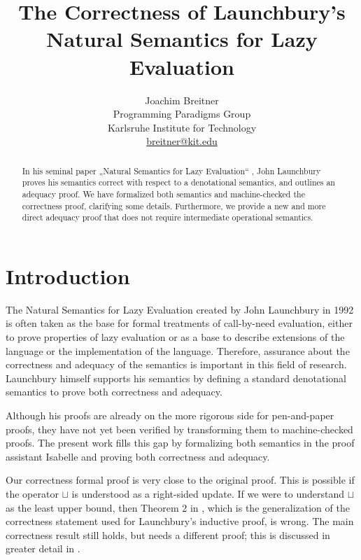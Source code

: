 \documentclass[11pt,a4paper,parskip=half]{scrartcl}
\begin{document}
\title{The Correctness of Launchbury's Natural Semantics for Lazy Evaluation}
\author{Joachim Breitner\\
Programming Paradigms Group\\
Karlsruhe Institute for Technology\\
\url{breitner@kit.edu}}
\maketitle

\begin{abstract}
In his seminal paper „Natural Semantics for Lazy Evaluation“ \cite{launchbury},
John Launchbury proves his semantics correct with respect to a denotational
semantics, and outlines an adequacy proof.
We have formalized both semantics and machine-checked the correctness proof,
clarifying some details.
Furthermore, we provide a new and more direct adequacy proof that does not
require intermediate operational semantics.
\end{abstract}

\tableofcontents

\section{Introduction}

The Natural Semantics for Lazy Evaluation \cite{launchbury} created by John Launchbury in 1992 is often taken as the base for formal treatments of call-by-need evaluation, either to prove properties of lazy evaluation or as a base to describe extensions of the language or the implementation of the language. Therefore, assurance about the correctness and adequacy of the semantics is important in this field of research. Launchbury himself supports his semantics by defining a standard denotational semantics to prove both correctness and adequacy.

Although his proofs are already on the more rigorous side for pen-and-paper proofs, they have not yet been verified by transforming them to machine-checked proofs.
The present work fills this gap by formalizing both semantics in the proof assistant Isabelle and proving both correctness and adequacy.

Our correctness formal proof is very close to the original proof. This is possible if the operator $\sqcup$ is understood as a right-sided update. If we were to understand $\sqcup$ as the least upper bound, then Theorem 2 in \cite{launchbury}, which is the generalization of the correctness statement used for Launchbury's inductive proof, is wrong. The main correctness result still holds, but needs a different proof; this is discussed in greater detail in \cite{breitner2013}.
\end{document}
